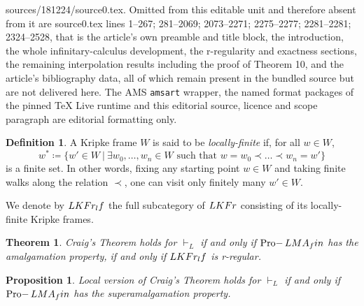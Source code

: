 \documentclass[10pt,a4paper]{amsart}
\newtheorem{thm}{Theorem}
\newtheorem{prop}{Proposition}
\theoremstyle{definition}
\newtheorem{defn}{Definition}
\newtheorem{rem}{Remark}
\DeclareMathOperator{\Pro}{Pro-}
\newcommand{\KFr}{\textup{\textbf{KFr}}}
\newcommand{\MA}{\textup{\textbf{MA}}}
\newcommand{\fin}{\textit{fin}}
\newcommand{\lf}{\textit{lf}}
\begin{document}
sources/181224/source0.tex. Omitted from this editable unit and therefore absent from it are source0.tex lines 1--267; 281--2069; 2073--2271; 2275--2277; 2281--2281; 2324--2528, that is the article's own preamble and title block, the introduction, the whole infinitary-calculus development, the r-regularity and exactness sections, the remaining interpolation results including the proof of Theorem 10, and the article's bibliography data, all of which remain present in the bundled source but are not delivered here. The AMS \texttt{amsart} wrapper, the named format packages of the pinned TeX Live runtime and this editorial source, licence and scope paragraph are editorial formatting only.\par\smallskip
\setcounter{section}{2}
\setcounter{equation}{0}
\setcounter{cor}{0}
\setcounter{defn}{0}
\setcounter{example}{0}
\setcounter{lem}{0}
\setcounter{prop}{0}
\setcounter{rem}{0}
\setcounter{thm}{1}
\begin{defn}
A Kripke frame $W$ is said to be \emph{locally-finite} if, for all $w \in W$,
$$w^* \coloneqq \{w' \in W\ \vert\ \exists w_0,\dots,w_n \in W \text{ such that } w=w_0 \prec \dots \prec w_n=w'\}$$
is a finite set. In other words, fixing any starting point $w \in W$ and taking finite walks along the relation $\prec$, one can visit only finitely many $w' \in W$.
\end{defn}
We denote by $L\KFr_\lf$ the full subcategory of $L\KFr$ consisting of its locally-finite Kripke frames.




\setcounter{section}{5}
\setcounter{equation}{0}
\setcounter{cor}{2}
\setcounter{defn}{7}
\setcounter{example}{2}
\setcounter{lem}{2}
\setcounter{prop}{10}
\setcounter{rem}{7}
\setcounter{thm}{9}
\begin{thm}\label{thm:craig=amalg}
Craig's Theorem holds for $\vdash_L$ if and only if $\Pro L\MA_\fin$ has the amalgamation property, if and only if $L\KFr_\lf$ is r-regular.
\end{thm}

\setcounter{section}{5}
\setcounter{equation}{0}
\setcounter{cor}{2}
\setcounter{defn}{8}
\setcounter{example}{2}
\setcounter{lem}{3}
\setcounter{prop}{10}
\setcounter{rem}{8}
\setcounter{thm}{11}
\begin{prop}
Local version of Craig's Theorem holds for $\vdash_L$ if and only if $\Pro L\MA_\fin$ has the superamalgamation property.
\end{prop}
\end{document}
